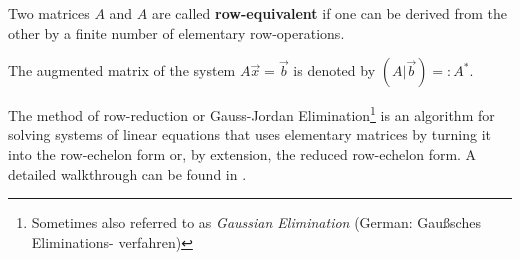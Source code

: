 \begin{definition}\label{def-row-equivalent}
	Two matrices $A$ and $A$ are called \textbf{row-equivalent} if one can be
	derived from the other by a finite number of elementary row-operations.
\end{definition}

\begin{definition}\label{def-augmented-matrix}
	The augmented matrix of the system $A\vec{x}=\vec{b}$ is denoted by
	$(A\vert\vec{b})=:A^*$.
\end{definition}

\begin{definition}\label{def-gauss-jordan-elimination}
	The method of row-reduction or Gauss-Jordan Elimination\footnote{Sometimes
		also referred to as \textit{Gaussian Elimination} (German: Gau{\ss}sches
		Eliminations- verfahren)} is an algorithm for solving systems of linear equations
	that uses elementary matrices by turning it into the row-echelon form or, by
	extension, the reduced row-echelon form. A detailed walkthrough can be found
	in .
\end{definition}

